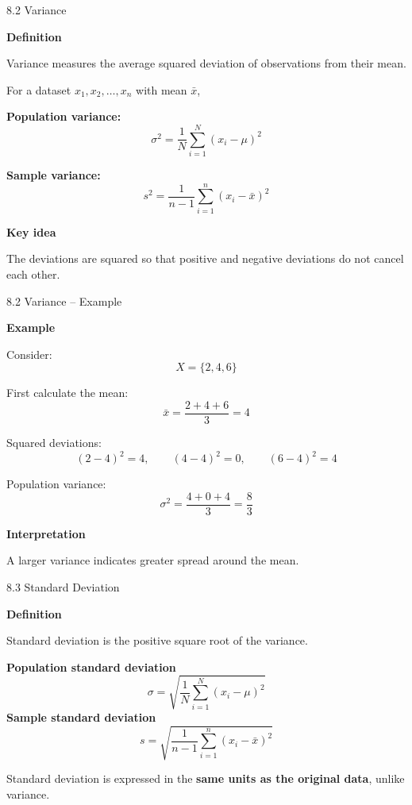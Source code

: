 
\begin{frame}{8.2 Variance}

\textbf{Definition}

Variance measures the average squared deviation of observations
from their mean.

\vspace{0.1cm}

For a dataset $x_1,x_2,\ldots,x_n$ with mean $\bar{x}$,

\textbf{Population variance:}
\[
\boxed{
\sigma^2
=
\frac{1}{N}
\sum_{i=1}^{N}(x_i-\mu)^2
}
\]

\textbf{Sample variance:}
\[
\boxed{
s^2
=
\frac{1}{n-1}
\sum_{i=1}^{n}(x_i-\bar{x})^2
}
\]

\textbf{Key idea}

The deviations are squared so that positive and negative
deviations do not cancel each other.

\end{frame}



\begin{frame}{8.2 Variance -- Example}

\textbf{Example}

Consider:
\[
X=\{2,4,6\}
\]

First calculate the mean:
\[
\bar{x}
=
\frac{2+4+6}{3}
=
4
\]

Squared deviations:
\[
(2-4)^2=4,\qquad
(4-4)^2=0,\qquad
(6-4)^2=4
\]

Population variance:
\[
\sigma^2
=
\frac{4+0+4}{3}
=
\boxed{\frac{8}{3}}
\]

\textbf{Interpretation}

A larger variance indicates greater spread around the mean.

\end{frame}



\begin{frame}{8.3 Standard Deviation}

\textbf{Definition}

Standard deviation is the positive square root of the variance.

\textbf{Population standard deviation}
\[
\boxed{
\sigma
=
\sqrt{
\frac{1}{N}
\sum_{i=1}^{N}(x_i-\mu)^2
}
}
\]
\textbf{Sample standard deviation}
\[
\boxed{
s
=
\sqrt{
\frac{1}{n-1}
\sum_{i=1}^{n}(x_i-\bar{x})^2
}
}
\]

Standard deviation is expressed in the \textbf{same units as the
original data}, unlike variance.

\end{frame}


